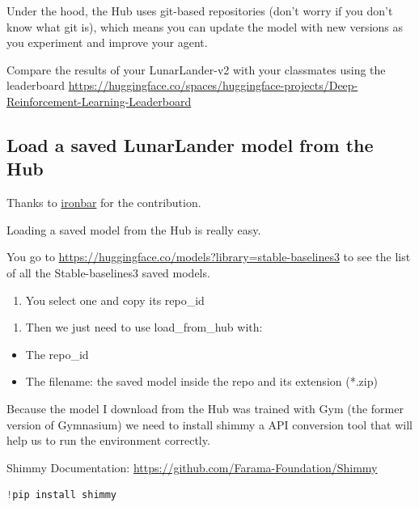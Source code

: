 \documentclass[11pt,a4paper]{article}
\begin{document}
Under the hood, the Hub uses git-based repositories (don't worry if you don't know what git is), which means you can update the model with new versions as you experiment and improve your agent.

Compare the results of your LunarLander-v2 with your classmates using the leaderboard \url{https://huggingface.co/spaces/huggingface-projects/Deep-Reinforcement-Learning-Leaderboard}

\subsection{Load a saved LunarLander model from the Hub}\label{load-a-saved-lunarlander-model-from-the-hub}

Thanks to \href{https://github.com/ironbar}{ironbar} for the contribution.

Loading a saved model from the Hub is really easy.

You go to \url{https://huggingface.co/models?library=stable-baselines3} to see the list of all the Stable-baselines3 saved models.

\begin{enumerate}
\def\labelenumi{\arabic{enumi}.}
\tightlist
\item
  You select one and copy its repo\_id
\end{enumerate}


\begin{enumerate}
\def\labelenumi{\arabic{enumi}.}
\setcounter{enumi}{1}
\tightlist
\item
  Then we just need to use load\_from\_hub with:
\end{enumerate}

\begin{itemize}
\tightlist
\item
  The repo\_id
\item
  The filename: the saved model inside the repo and its extension (*.zip)
\end{itemize}

Because the model I download from the Hub was trained with Gym (the former version of Gymnasium) we need to install shimmy a API conversion tool that will help us to run the environment correctly.

Shimmy Documentation: \url{https://github.com/Farama-Foundation/Shimmy}

\begin{lstlisting}[language=Python]
!pip install shimmy
\end{lstlisting}
\end{document}
